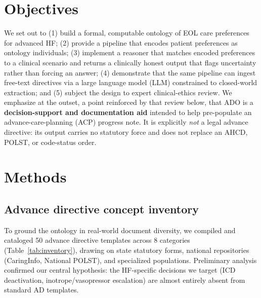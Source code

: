 \documentclass[10pt]{article}
\begin{document}
\section{Objectives}
We set out to (1) build a formal, computable ontology of EOL care preferences for advanced HF; (2) provide a pipeline that encodes patient preferences as ontology individuals; (3) implement a reasoner that matches encoded preferences to a clinical scenario and returns a clinically honest output that flags uncertainty rather than forcing an answer; (4) demonstrate that the same pipeline can ingest free-text directives via a large language model (LLM) constrained to closed-world extraction; and (5) subject the design to expert clinical-ethics review. We emphasize at the outset, a point reinforced by that review below, that ADO is a \textbf{decision-support and documentation aid} intended to help pre-populate an advance-care-planning (ACP) progress note. It is explicitly \emph{not} a legal advance directive: its output carries no statutory force and does not replace an AHCD, POLST, or code-status order.

\section{Methods}

\subsection{Advance directive concept inventory}
To ground the ontology in real-world document diversity, we compiled and cataloged 50 advance directive templates across 8 categories (Table~\ref{tab:inventory}), drawing on state statutory forms, national repositories (CaringInfo,\cite{caringinfo} National POLST\cite{polst}), and specialized populations. Preliminary analysis confirmed our central hypothesis: the HF-specific decisions we target (ICD deactivation, inotrope/vasopressor escalation) are almost entirely absent from standard AD templates.
\end{document}

